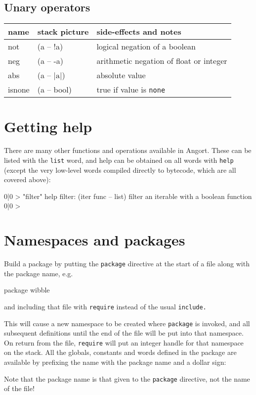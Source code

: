 \subsection{Unary operators}
\begin{center}
\begin{tabular}{|l|l|p{4in}|}\hline
\textbf{name} & \textbf{stack picture} & \textbf{side-effects and notes}\\ \hline
not & (a -- !a) & logical negation of a boolean\\
neg & (a -- -a) & arithmetic negation of float or integer\\
abs & (a -- $|\textrm{a}|$) & absolute value\\
isnone & (a -- bool) & true if value is \texttt{none} \\
\hline
\end{tabular}
\end{center}

\section{Getting help}
There are many other functions and operations available in Angort.
These can be listed with the \texttt{list} word, and help can
be obtained on all words with \texttt{help} (except the very low-level words compiled
directly to bytecode, which are all covered above):
\begin{v}
0|0 > "filter" help
filter: (iter func -- list) filter an iterable with a boolean function
0|0 > 
\end{v}

\section{Namespaces and packages}
Build a package by putting the \texttt{package} directive at the start
of a file along with the package name, e.g.
\begin{v}
package wibble
\end{v}

and including that file with \texttt{require} instead of the usual \texttt{include.} 

This will cause a new namespace to be created where \texttt{package} is 
invoked, and all subsequent definitions until the end of the file will
be put into that namespace. On return from the file, \texttt{require} will
put an integer handle for that namespace on the stack. All the globals,
constants and words defined in the package are available by prefixing
the name with the package name and a dollar sign:
Note that the package name is that given to the \texttt{package} directive,
not the name of the file!

